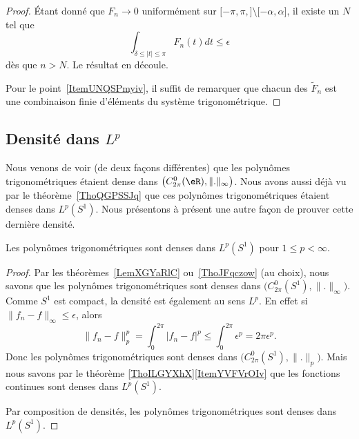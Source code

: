 \begin{proof}
	Étant donné que \( F_n\to 0\) uniformément sur \( \mathopen[ -\pi,\pi ,  \mathclose]\setminus\mathopen[ -\alpha , \alpha \mathclose]\), il existe un \( N\) tel que
	\begin{equation}
		\int_{\delta\leq| t |\leq \pi}F_n(t)dt\leq \epsilon
	\end{equation}
	dès que \( n>N\). Le résultat en découle.

	Pour le point~\ref{ItemUNQSPmyiv}, il suffit de remarquer que chacun des \( \tilde F_n\) est une combinaison finie d'éléments du système trigonométrique.
\end{proof}


\subsection{Densité dans \texorpdfstring{\(  L^p\)}{Lp}}

Nous venons de voir (de deux façons différentes) que les polynômes trigonométriques étaient dense dans \( \big( C^0_{2\pi}(\eR),\| . \|_{\infty} \big)\). Nous avons aussi déjà vu par le théorème~\ref{ThoQGPSSJq} que ces polynômes trigonométriques étaient denses dans \( L^p(S^1)\). Nous présentons à présent une autre façon de prouver cette dernière densité.

\begin{theorem}     \label{ThoDPTwimI}
	Les polynômes trigonométriques sont denses dans \( L^p(S^1)\) pour \( 1\leq p <\infty\).
\end{theorem}

\begin{proof}
	Par les théorèmes~\ref{LemXGYaRlC} ou~\ref{ThoJFqczow} (au choix), nous savons que les polynômes trigonométriques sont denses dans \( \big( C^0_{2\pi}(S^1),\| . \|_{\infty} \big)\). Comme \( S^1\) est compact, la densité est également au sens \( L^p\). En effet si \( \| f_n-f \|_{\infty}\leq \epsilon\), alors
	\begin{equation}
		\| f_n-f \|_p^p=\int_0^{2\pi}| f_n-f |^p\leq\int_0^{2\pi}\epsilon^p=2\pi\epsilon^p.
	\end{equation}
	Donc les polynômes trigonométriques sont denses dans \( \big( C^0_{2\pi}(S^1),\| . \|_p \big)\). Mais nous savons par le théorème \ref{ThoILGYXhX}\ref{ItemYVFVrOIv} que les fonctions continues sont denses dans \( L^p(S^1)\).

	Par composition de densités, les polynômes trigonométriques sont denses dans \( L^p(S^1)\).
\end{proof}

